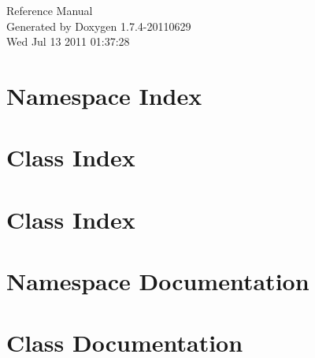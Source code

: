 \documentclass[a4paper]{book}
\begin{document}
\hypersetup{pageanchor=false}
\begin{titlepage}
\vspace*{7cm}
\begin{center}
{\Large Reference Manual}\\
\vspace*{1cm}
{\large Generated by Doxygen 1.7.4-20110629}\\
\vspace*{0.5cm}
{\small Wed Jul 13 2011 01:37:28}\\
\end{center}
\end{titlepage}
\clearemptydoublepage
{}
\tableofcontents
\clearemptydoublepage
{}
\hypersetup{pageanchor=true}
\chapter{Namespace Index}

\chapter{Class Index}

\chapter{Class Index}

\chapter{Namespace Documentation}


\chapter{Class Documentation}















\printindex
\end{document}
